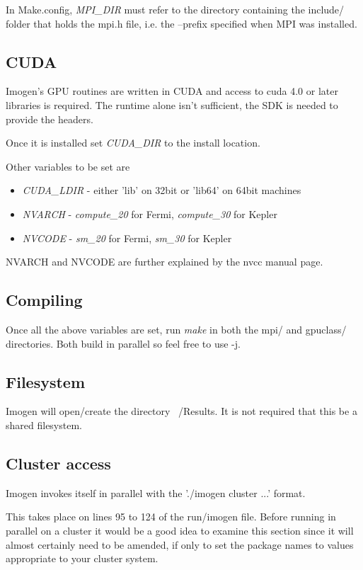 \documentclass[letterpaper,12pt]{article}
\begin{document}
In Make.config, \textit{MPI\_DIR} must refer to the directory containing the include/ folder
that holds the mpi.h file, i.e. the --prefix specified when MPI was installed.

\subsection{CUDA}

Imogen's GPU routines are written in CUDA and access to cuda 4.0 or later
libraries is required. The runtime alone isn't sufficient, the SDK is
needed to provide the headers.

Once it is installed set \textit{CUDA\_DIR} to the install location.

Other variables to be set are
\begin{itemize}
\item \textit{CUDA\_LDIR} - either 'lib' on 32bit or 'lib64' on 64bit machines
\item \textit{NVARCH} - \textit{compute\_20} for Fermi, \textit{compute\_30} for Kepler
\item \textit{NVCODE} - \textit{sm\_20} for Fermi, \textit{sm\_30} for Kepler
\end{itemize}

NVARCH and NVCODE are further explained by the nvcc manual page.

\subsection{Compiling}

Once all the above variables are set, run \textit{make} in both the mpi/ and gpuclass/
directories. Both build in parallel so feel free to use -j. 

\subsection{Filesystem}

Imogen will open/create the directory ~/Results. It is not required that this
be a shared filesystem.

\subsection{Cluster access}

Imogen invokes itself in parallel with the './imogen cluster ...' format.

This takes place on lines 95 to 124 of the run/imogen file. Before running
in parallel on a cluster it would be a good idea to examine this section since
it will almost certainly need to be amended, if only to set the package
names to values appropriate to your cluster system.
\end{document}
